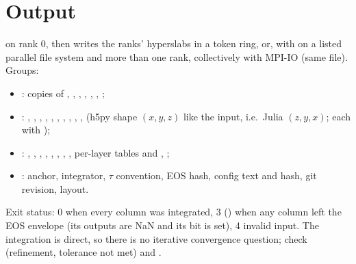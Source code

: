 \section{Output}
 on rank 0, then  writes the ranks' hyperslabs in a token ring, or, with
 on a listed parallel file system and more than one rank, collectively with MPI-IO (same file). Groups:
\begin{itemize}
\item {}: copies of , , , , , , ;
\item {}: , , , , , , ,
, , ,  (h5py shape $(x,y,z)$ like the input, i.e.\ Julia
$(z,y,x)$; each with );
\item {}: , , , , ,
, , , per-layer tables  and
, ;
\item {}: anchor, integrator, $\tau$ convention, EOS hash, config text and hash, git revision, layout.
\end{itemize}
Exit status: 0 when every column was integrated, 3 () when any column left the EOS envelope (its
outputs are NaN and its  bit is set), 4 invalid input. The integration is direct, so there is no
iterative convergence question; check  (refinement, tolerance not met) and .

